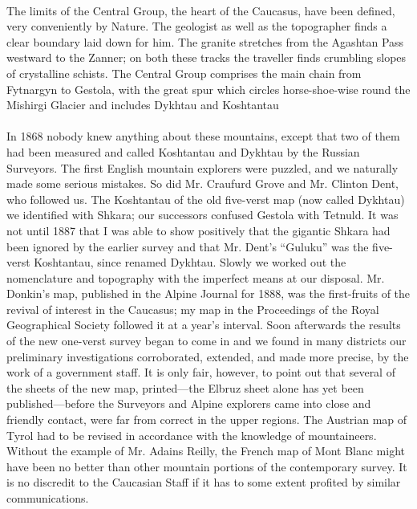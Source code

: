 \documentclass[25pt, a4paper]{article}
\begin{document}
\paragraph{} \normalsize The limits of the Central Group, the heart of the Caucasus, have been defined, very conveniently by Nature. The geologist as well as the topographer finds a clear boundary laid down for him. The granite stretches from the Agashtan Pass westward to the Zanner; on both these tracks the traveller finds crumbling slopes of crystalline schists. The Central Group comprises the main chain from Fytnargyn to Gestola, with the great spur which circles horse-shoe-wise round the Mishirgi Glacier and includes Dykhtau and Koshtantau
	
\paragraph{} In 1868 nobody knew anything about these mountains, except that two of them had been measured and called Koshtantau and Dykhtau by the Russian Surveyors. The first English mountain explorers were puzzled, and we naturally made some serious mistakes. So did Mr. Craufurd Grove and Mr. Clinton Dent, who followed us. The Koshtantau of the old five-verst map (now called Dykhtau) we identified with Shkara; our successors confused Gestola with Tetnuld. It was not until 1887 that I was able to show positively that the gigantic Shkara had been ignored by the earlier survey and that Mr. Dent's “Guluku” was the five-verst Koshtantau, since renamed Dykhtau. Slowly we worked out the nomenclature and topography with the imperfect means at our disposal. Mr. Donkin's map, published in the Alpine Journal for 1888, was the first-fruits of the revival of interest in the Caucasus; my map in the Proceedings of the Royal Geographical Society followed it at a year's interval. Soon afterwards the results of the new one-verst survey began to come in and we found in many districts our preliminary investigations corroborated, extended, and made more precise, by the work of a government staff. It is only fair, however, to point out that several of the sheets of the new map, printed—the Elbruz sheet alone has yet been published—before the Surveyors and Alpine explorers came into close and friendly contact, were far from correct in the upper regions. The Austrian map of Tyrol had to be revised in accordance with the knowledge of mountaineers. Without the example of Mr. Adains Reilly, the French map of Mont Blanc might have been no better than other mountain portions of the contemporary survey. It is no discredit to the Caucasian Staff if it has to some extent profited by similar communications.
	
\end{document}
